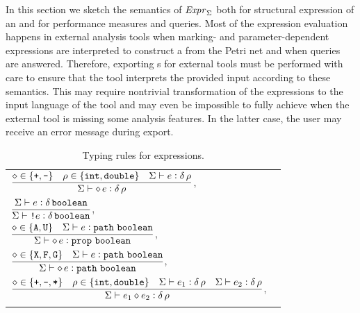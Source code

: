 In this section we sketch the semantics of \(\textrm{\itshape Expr\/}_\Sigma\) both for structural expression of an  and for performance measures and queries. Most of the expression evaluation happens in external analysis tools when marking- and parameter-dependent expressions are interpreted to construct a  from the Petri net and when queries are answered. Therefore, exporting s for external tools must be performed with care to ensure that the tool interprets the provided input according to these semantics. This may require nontrivial transformation of the expressions to the input language of the tool and may even be impossible to fully achieve when the external tool is missing some analysis features. In the latter case, the user may receive an error message during export.

\begin{table}[t!]
  \caption{Typing rules for expressions.}
  \label{fig:rgspn:typing}
\end{table}
